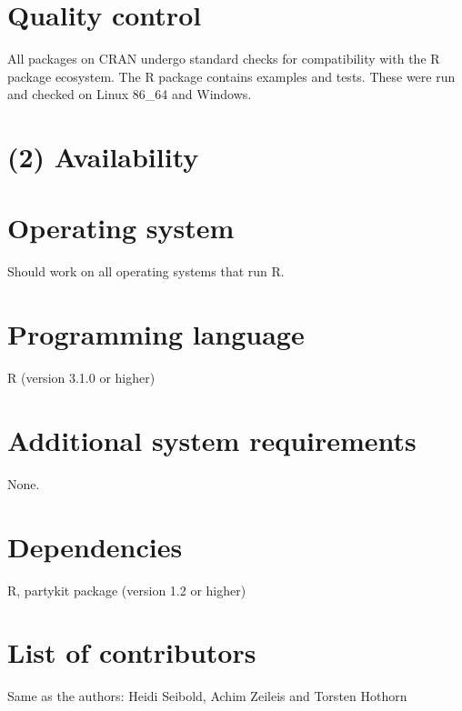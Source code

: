 \documentclass{josr}\usepackage[]{graphicx}\usepackage[]{color}
\begin{document}
\section*{Quality control}
All packages on CRAN undergo standard checks for compatibility with the R
package ecosystem.  The R package contains examples and tests. These were run
and checked on Linux 86\_64 and Windows.


\section*{(2) Availability}
\vspace{0.5cm}
\section*{Operating system}

Should work on all operating systems that run R.

\section*{Programming language}
R (version 3.1.0 or higher)

\section*{Additional system requirements}
None.

\section*{Dependencies}
R, partykit package (version 1.2 or higher)

\section*{List of contributors}
Same as the authors:
Heidi Seibold, Achim Zeileis and Torsten Hothorn
\end{document}
